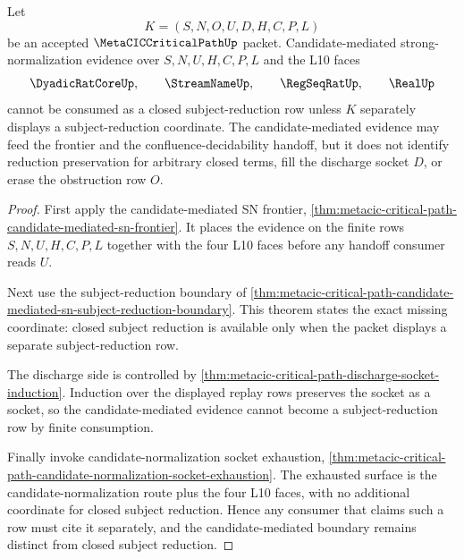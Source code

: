 \begin{theorem}
\label{thm:metacic-critical-path-candidate-sn-boundary}
Let
$$
K=(S,N,O,U,D,H,C,P,L)
$$
be an accepted $\MetaCICCriticalPathUp$ packet. Candidate-mediated strong-normalization evidence over $S,N,U,H,C,P,L$ and the L10 faces
$$
\DyadicRatCoreUp,\qquad
\StreamNameUp,\qquad
\RegSeqRatUp,\qquad
\RealUp
$$
cannot be consumed as a closed subject-reduction row unless $K$ separately displays a subject-reduction coordinate. The candidate-mediated evidence may feed the frontier and the confluence-decidability handoff, but it does not identify reduction preservation for arbitrary closed terms, fill the discharge socket $D$, or erase the obstruction row $O$.
\end{theorem}
\begin{proof}
First apply the candidate-mediated SN frontier, \autoref{thm:metacic-critical-path-candidate-mediated-sn-frontier}. It places the evidence on the finite rows $S,N,U,H,C,P,L$ together with the four L10 faces before any handoff consumer reads $U$.

Next use the subject-reduction boundary of \autoref{thm:metacic-critical-path-candidate-mediated-sn-subject-reduction-boundary}. This theorem states the exact missing coordinate: closed subject reduction is available only when the packet displays a separate subject-reduction row.

The discharge side is controlled by \autoref{thm:metacic-critical-path-discharge-socket-induction}. Induction over the displayed replay rows preserves the socket as a socket, so the candidate-mediated evidence cannot become a subject-reduction row by finite consumption.

Finally invoke candidate-normalization socket exhaustion, \autoref{thm:metacic-critical-path-candidate-normalization-socket-exhaustion}. The exhausted surface is the candidate-normalization route plus the four L10 faces, with no additional coordinate for closed subject reduction. Hence any consumer that claims such a row must cite it separately, and the candidate-mediated boundary remains distinct from closed subject reduction.
\end{proof}

